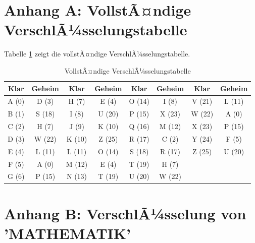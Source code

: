 ﻿\documentclass[12pt,a4paper]{article}
\begin{document}
	\section{Anhang A: VollstÃ¤ndige VerschlÃ¼sselungstabelle}
	Tabelle \ref{tab:full-chiffre} zeigt die vollstÃ¤ndige VerschlÃ¼sselungstabelle.
	\begin{table}[H]
		\caption{VollstÃ¤ndige VerschlÃ¼sselungstabelle}
		\label{tab:full-chiffre}
		\centering
		\small
		\begin{tabular}{|c|c|c|c|c|c|c|c|}
			\hline
			\textbf{Klar} & \textbf{Geheim} & \textbf{Klar} & \textbf{Geheim} & \textbf{Klar} & \textbf{Geheim} & \textbf{Klar} & \textbf{Geheim} \\
			\hline
			A (0) & D (3) & H (7) & E (4) & O (14) & I (8) & V (21) & L (11) \\
			B (1) & S (18) & I (8) & U (20) & P (15) & X (23) & W (22) & A (0) \\
			C (2) & H (7) & J (9) & K (10) & Q (16) & M (12) & X (23) & P (15) \\
			D (3) & W (22) & K (10) & Z (25) & R (17) & C (2) & Y (24) & F (5) \\
			E (4) & L (11) & L (11) & O (14) & S (18) & R (17) & Z (25) & U (20) \\
			F (5) & A (0) & M (12) & E (4) & T (19) & H (7) & & \\
			G (6) & P (15) & N (13) & T (19) & U (20) & W (22) & & \\
			\hline
		\end{tabular}
	\end{table}
	
	\section{Anhang B: VerschlÃ¼sselung von 'MATHEMATIK'}
	
\end{document}
